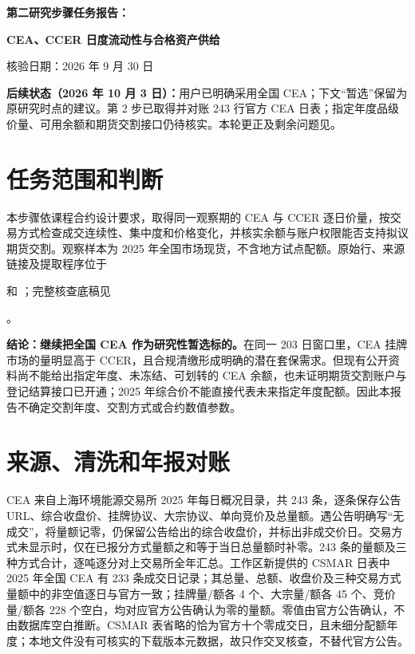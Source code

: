 \documentclass[UTF8,a4paper,11pt,oneside,fontset=fandol]{ctexart}
\begin{document}
\thispagestyle{plain}
\begin{center}
{\LARGE\bfseries 第二研究步骤任务报告：\par}
{\LARGE\bfseries CEA、CCER 日度流动性与合格资产供给\par}
\vspace{0.4em}
{\small 核验日期：2026 年 9 月 30 日}\par
\end{center}

\noindent\textbf{后续状态（2026 年 10 月 3 日）：}用户已明确采用全国 CEA；下文“暂选”保留为原研究时点的建议。第 2 步已取得并对账 243 行官方 CEA 日表；指定年度品级价量、可用余额和期货交割接口仍待核实。本轮更正及剩余问题见。

\section{任务范围和判断}
本步骤依课程合约设计要求，取得同一观察期的 CEA 与 CCER 逐日价量，按交易方式检查成交连续性、集中度和价格变化，并核实余额与账户权限能否支持拟议期货交割。观察样本为 2025 年全国市场现货，不含地方试点配额。原始行、来源链接及提取程序位于\par\noindent{}\par\noindent 和 ；完整核查底稿见\par\noindent{}。

\textbf{结论：继续把全国 CEA 作为研究性暂选标的。}在同一 203 日窗口里，CEA 挂牌市场的量明显高于 CCER，且合规清缴形成明确的潜在套保需求。但现有公开资料尚不能给出指定年度、未冻结、可划转的 CEA 余额，也未证明期货交割账户与登记结算接口已开通；2025 年综合价不能直接代表未来指定年度配额。因此本报告不确定交割年度、交割方式或合约数值参数。

\section{来源、清洗和年报对账}
CEA 来自上海环境能源交易所 2025 年每日概况目录，共 243 条，逐条保存公告 URL、综合收盘价、挂牌协议、大宗协议、单向竞价及总量额\cite{she2025daily}。遇公告明确写“无成交”，将量额记零，仍保留公告给出的综合收盘价，并标出非成交价日。交易方式未显示时，仅在已报分方式量额之和等于当日总量额时补零。243 条的量额及三种方式合计，逐吨逐分对上交易所全年汇总\cite{she2025annual}。工作区新提供的 CSMAR 日表中 2025 年全国 CEA 有 233 条成交日记录；其总量、总额、收盘价及三种交易方式量额中的非空值逐日与官方一致；挂牌量/额各 4 个、大宗量/额各 45 个、竞价量/额各 228 个空白，均对应官方公告确认为零的量额。零值由官方公告确认，不由数据库空白推断。CSMAR 表省略的恰为官方十个零成交日，且未细分配额年度；本地文件没有可核实的下载版本元数据，故只作交叉核查，不替代官方公告\cite{csmar2026}。
\end{document}
